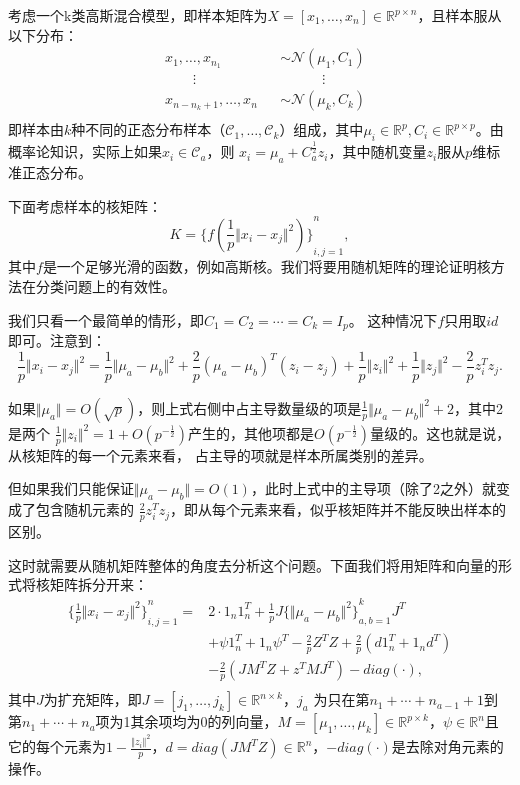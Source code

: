 \documentclass[UTF8,12pt]{ctexart}
\begin{document}
考虑一个k类高斯混合模型，即样本矩阵为$X = [x_1,\ldots,x_n] \in \mathbb R^{p\times n}$，且样本服从以下分布：
\[
    \begin{aligned}
        &x_1,\ldots,x_{n_1} && \sim \mathcal{N} (\mu_1,C_1)\\
        &\qquad\vdots && \qquad\quad\vdots \\
        &x_{n-n_k+1},\ldots,x_{n} && \sim \mathcal{N} (\mu_k,C_k)\\
    \end{aligned}
\]  
即样本由$k$种不同的正态分布样本（$\mathcal{C}_1,\ldots,\mathcal{C}_k$）组成，其中$\mu_i \in \mathbb R ^p, C_i \in \mathbb R^{p\times p}$。由概率论知识，实际上如果$x_i \in \mathcal{C}_a$，则
$x_i = \mu_a + C_a^{\frac{1}{2}}z_i$，其中随机变量$z_i$服从$p$维标准正态分布。

下面考虑样本的核矩阵：
\[
    K = {\{ f(\frac{1}{p}{\Vert x_i-x_j \Vert}^2) \}}_{i,j=1}^n,
\]  
其中$f$是一个足够光滑的函数，例如高斯核。我们将要用随机矩阵的理论证明核方法在分类问题上的有效性。

我们只看一个最简单的情形，即$C_1 = C_2 = \cdots = C_k = I_p$。
这种情况下$f$只用取$id$即可。注意到：
\[
    \frac{1}{p}{\Vert x_i-x_j \Vert}^2 = \frac{1}{p}{\Vert \mu_a-\mu_b \Vert}^2 +
    \frac{2}{p}{(\mu_a-\mu_b)}^T(z_i-z_j) + \frac{1}{p}{\Vert z_i \Vert}^2 + 
    \frac{1}{p}{\Vert z_j \Vert}^2 -\frac{2}{p} z_i^T z_j.
\]  

如果$\Vert \mu_a \Vert = O(\sqrt{p})$，则上式右侧中占主导数量级的项是$\frac{1}{p}{\Vert \mu_a-\mu_b \Vert}^2 + 2$，其中2是两个
$\frac{1}{p}{\Vert z_i \Vert}^2 = 1+O(p^{-\frac{1}{2}})$产生的，其他项都是$O(p^{-\frac{1}{2}})$量级的。这也就是说，从核矩阵的每一个元素来看，
占主导的项就是样本所属类别的差异。

但如果我们只能保证$\Vert \mu_a-\mu_b \Vert = O(1)$，此时上式中的主导项（除了2之外）就变成了包含随机元素的
$\frac{2}{p} z_i^T z_j$，即从每个元素来看，似乎核矩阵并不能反映出样本的区别。

这时就需要从随机矩阵整体的角度去分析这个问题。下面我们将用矩阵和向量的形式将核矩阵拆分开来：
\[
    \begin{aligned}
        {\{\frac{1}{p}{\Vert x_i-x_j \Vert}^2\}}_{i,j=1}^n = &
         2 \cdot 1_n 1_n^T + \frac{1}{p}J{\{{\Vert \mu_a-\mu_b \Vert}^2\}}_{a,b=1}^k J^T \\
        & + \psi 1_n^T + 1_n \psi^T - \frac{2}{p}Z^T Z + \frac{2}{p}(d 1_n^T + 1_n d^T) \\
        & -\frac{2}{p}(J M^T Z + z^T M J^T) - diag(\cdot), \\
    \end{aligned}
\]
其中$J$为扩充矩阵，即$J=[j_1,\ldots,j_k] \in \mathbb R ^{n\times k}$，$j_a$ 为只在第$n_1+\cdots+n_{a-1}+1$到第$n_1+\cdots+n_a$项为1其余项均为0的列向量，$M = [\mu_1,\ldots,\mu_k] \in \mathbb R ^{p \times k}$，$\psi \in \mathbb R ^n$且它的每个元素为$1-\frac{{\Vert z_i \Vert}^2}{p}$，$d = diag(JM^T Z)\in \mathbb R^n$，$-diag(\cdot)$是去除对角元素的操作。
\end{document}
